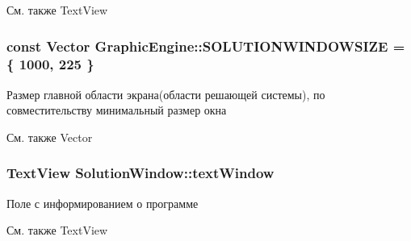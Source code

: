 \begin{DoxySeeAlso}{См. также}
TextView  
\end{DoxySeeAlso}
\hypertarget{group___u_i_gaa5d97e29cf14f8fd13ff22d209ae9785}{
\subsubsection[{SOLUTIONWINDOWSIZE}]{\setlength{\rightskip}{0pt plus 5cm}const Vector {\bf GraphicEngine::SOLUTIONWINDOWSIZE} = \{ 1000, 225 \}}}
\label{group___u_i_gaa5d97e29cf14f8fd13ff22d209ae9785}


Размер главной области экрана(области решающей системы), по совместительству минимальный размер окна 

\begin{DoxySeeAlso}{См. также}
Vector  
\end{DoxySeeAlso}
\hypertarget{group___u_i_gae4813ff258c826e4956286e327f16044}{
\subsubsection[{textWindow}]{\setlength{\rightskip}{0pt plus 5cm}TextView {\bf SolutionWindow::textWindow}}}
\label{group___u_i_gae4813ff258c826e4956286e327f16044}


Поле с информированием о программе 

\begin{DoxySeeAlso}{См. также}
TextView  
\end{DoxySeeAlso}
